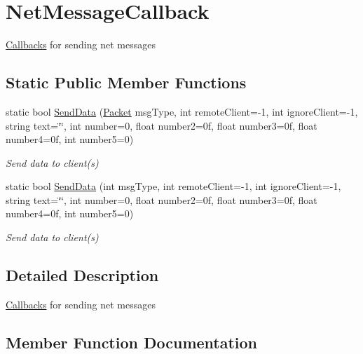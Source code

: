 \hypertarget{classOTA_1_1Callbacks_1_1NetMessageCallback}{}\section{Net\+Message\+Callback}
\label{classOTA_1_1Callbacks_1_1NetMessageCallback}


\hyperlink{namespaceOTA_1_1Callbacks}{Callbacks} for sending net messages  


\subsection*{Static Public Member Functions}
\begin{DoxyCompactItemize}
\item 
static bool \hyperlink{classOTA_1_1Callbacks_1_1NetMessageCallback_a826256a718d5b230a5daf55a67bbc679}{Send\+Data} (\hyperlink{namespaceOTA_a171602badf7b6889d328488937bafa63}{Packet} msg\+Type, int remote\+Client=-\/1, int ignore\+Client=-\/1, string text=\char`\"{}\char`\"{}, int number=0, float number2=0f, float number3=0f, float number4=0f, int number5=0)
\begin{DoxyCompactList}\small\item\em Send data to client(s) \end{DoxyCompactList}\item 
static bool \hyperlink{classOTA_1_1Callbacks_1_1NetMessageCallback_a5b2c81cf29d8a4e1924317241fd9c7a2}{Send\+Data} (int msg\+Type, int remote\+Client=-\/1, int ignore\+Client=-\/1, string text=\char`\"{}\char`\"{}, int number=0, float number2=0f, float number3=0f, float number4=0f, int number5=0)
\begin{DoxyCompactList}\small\item\em Send data to client(s) \end{DoxyCompactList}\end{DoxyCompactItemize}


\subsection{Detailed Description}
\hyperlink{namespaceOTA_1_1Callbacks}{Callbacks} for sending net messages 



\subsection{Member Function Documentation}
\hypertarget{classOTA_1_1Callbacks_1_1NetMessageCallback_a826256a718d5b230a5daf55a67bbc679}{}
